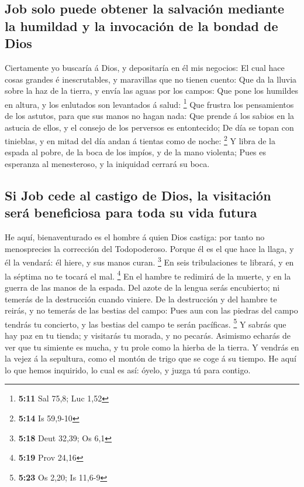 \hypertarget{job-solo-puede-obtener-la-salvaciuxf3n-mediante-la-humildad-y-la-invocaciuxf3n-de-la-bondad-de-dios}{%
\subsection{Job solo puede obtener la salvación mediante la humildad y
la invocación de la bondad de
Dios}\label{job-solo-puede-obtener-la-salvaciuxf3n-mediante-la-humildad-y-la-invocaciuxf3n-de-la-bondad-de-dios}}

 Ciertamente yo buscaría á Dios, y depositaría en él mis
negocios:  El cual hace cosas grandes é inescrutables, y
maravillas que no tienen cuento:  Que da la lluvia sobre
la haz de la tierra, y envía las aguas por los campos: 
Que pone los humildes en altura, y los enlutados son levantados á salud:
\footnote{\textbf{5:11} Sal 75,8; Luc 1,52}  Que frustra
los pensamientos de los astutos, para que sus manos no hagan nada:
 Que prende á los sabios en la astucia de ellos, y el
consejo de los perversos es entontecido;  De día se topan
con tinieblas, y en mitad del día andan á tientas como de noche:
\footnote{\textbf{5:14} Is 59,9-10}  Y libra de la espada
al pobre, de la boca de los impíos, y de la mano violenta;
 Pues es esperanza al menesteroso, y la iniquidad cerrará
su boca.

\hypertarget{si-job-cede-al-castigo-de-dios-la-visitaciuxf3n-seruxe1-beneficiosa-para-toda-su-vida-futura}{%
\subsection{Si Job cede al castigo de Dios, la visitación será
beneficiosa para toda su vida
futura}\label{si-job-cede-al-castigo-de-dios-la-visitaciuxf3n-seruxe1-beneficiosa-para-toda-su-vida-futura}}

 He aquí, bienaventurado es el hombre á quien Dios
castiga: por tanto no menosprecies la corrección del Todopoderoso.
 Porque él es el que hace la llaga, y él la vendará: él
hiere, y sus manos curan. \footnote{\textbf{5:18} Deut 32,39; Os 6,1}
 En seis tribulaciones te librará, y en la séptima no te
tocará el mal. \footnote{\textbf{5:19} Prov 24,16}  En el
hambre te redimirá de la muerte, y en la guerra de las manos de la
espada.  Del azote de la lengua serás encubierto; ni
temerás de la destrucción cuando viniere.  De la
destrucción y del hambre te reirás, y no temerás de las bestias del
campo:  Pues aun con las piedras del campo tendrás tu
concierto, y las bestias del campo te serán pacíficas. \footnote{\textbf{5:23}
  Os 2,20; Is 11,6-9}  Y sabrás que hay paz en tu tienda;
y visitarás tu morada, y no pecarás.  Asimismo echarás de
ver que tu simiente es mucha, y tu prole como la hierba de la tierra.
 Y vendrás en la vejez á la sepultura, como el montón de
trigo que se coge á su tiempo.  He aquí lo que hemos
inquirido, lo cual es así: óyelo, y juzga tú para contigo.

